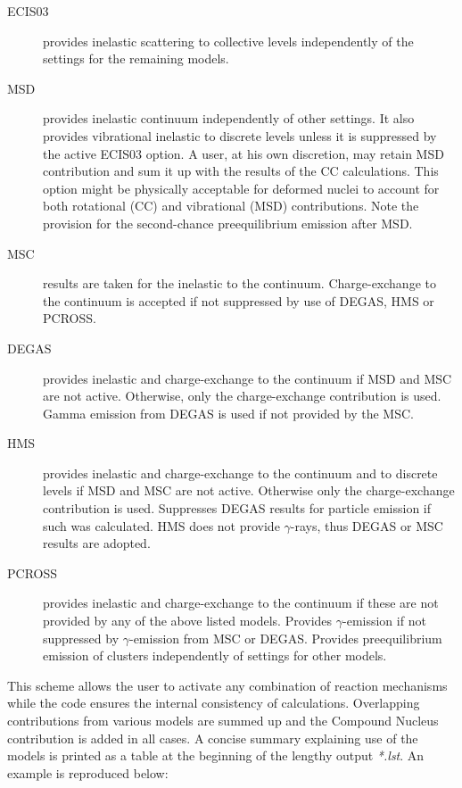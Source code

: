 \documentclass[twocolumn,amsmath,amssymb,10pt,groupedaddress,a4paper]{revtex4}
\begin{document}
\begin{description}
\item [ECIS03]provides inelastic scattering to collective
levels independently of the settings for the remaining models.
\item [MSD]provides inelastic continuum independently of other
settings. It also provides vibrational inelastic to discrete levels unless
it is suppressed by the active ECIS03 option.
A user, at his own discretion, may retain MSD contribution and sum it
up with the results of the CC calculations. This option might be physically
acceptable for deformed nuclei to account for both rotational (CC) and
vibrational (MSD) contributions. Note the provision for the second-chance preequilibrium
emission after MSD.
\item [MSC]results are taken for the inelastic to the continuum.
Charge-exchange to the continuum is accepted if not suppressed by
use of DEGAS, HMS or PCROSS.
\item [DEGAS]provides inelastic and charge-exchange to  the
continuum if MSD and MSC are not active. Otherwise,
only the charge-exchange contribution is used. Gamma emission from
DEGAS is used if not provided by the MSC.
\item [HMS]provides inelastic and charge-exchange to the continuum
and to discrete levels if MSD and MSC are
not active. Otherwise only the charge-exchange contribution is used.
Suppresses DEGAS results for particle emission if such
was calculated. HMS does not provide $\gamma$-rays, thus DEGAS or
MSC results are adopted.
\item [PCROSS]provides inelastic and charge-exchange to
the continuum if these are not provided by any of the above listed
models. Provides $\gamma$-emission if not suppressed by $\gamma$-emission
from MSC or DEGAS. Provides preequilibrium emission of clusters independently
of settings for other models.
\end{description}
This scheme allows the user to activate any combination of reaction
mechanisms while the code ensures the internal consistency of calculations.
Overlapping contributions from various models are summed up and the
Compound Nucleus contribution is added in all cases. A concise summary
explaining use of the models is printed as a table at the beginning
of the lengthy output \emph{{*}.lst}. An example is reproduced below:
\end{document}
